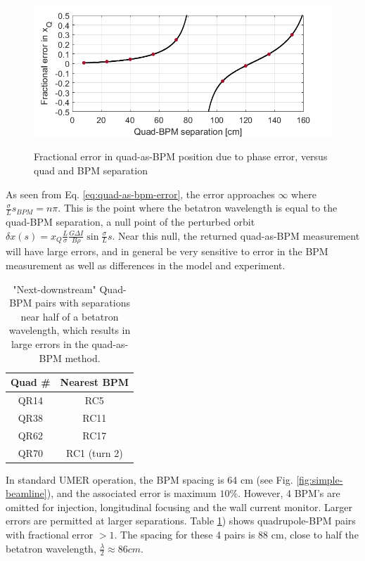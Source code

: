 \begin{figure}
\begin{center}
\includegraphics[width=\textwidth]{4.figures/quad_as_BPM_error.png}
\end{center}
\renewcommand{\baselinestretch}{1}
\small\normalsize
\begin{quote}
\caption[]{Fractional error in quad-as-BPM position due to phase error, versus quad and BPM separation}
\label{fig:quad-as-bpm-error}
\end{quote}
\end{figure} 
\renewcommand{\baselinestretch}{2}
\small\normalsize


As seen from Eq. \ref{eq:quad-as-bpm-error}, the error approaches $\infty$ where $\frac{\sigma}{L}s_{BPM} = n\pi$. This is the point where the betatron wavelength is equal to the quad-BPM separation, a null point of the perturbed orbit $\delta x(s) = x_Q \frac{L}{\sigma} \frac{G \Delta I}{B\rho} \sin{\frac{\sigma}{L}s}$. Near this null, the returned quad-as-BPM measurement will have large errors, and in general be very sensitive to error in the BPM measurement as well as differences in the model and experiment. 


\begin{table}
\centering
\caption{"Next-downstream" Quad-BPM pairs with separations near half of a betatron wavelength, which results in large errors in the quad-as-BPM method.}
\label{tab:nulls}
\begin{tabular}{|c|c|}
Quad \# & Nearest BPM  \\
\hline
QR14 & RC5  \\
QR38 & RC11  \\
QR62 & RC17  \\
QR70 & RC1 (turn 2)  \\
\end{tabular}
\end{table}


In standard UMER operation, the BPM spacing is 64 cm (see Fig. \ref{fig:simple-beamline}), and the associated error is maximum $10\%$. However, 4 BPM's are omitted for injection, longitudinal focusing and the wall current monitor. Larger errors are permitted at larger separations. 
Table \ref{tab:nulls}) shows quadrupole-BPM pairs with fractional error $>1$. The spacing for these 4 pairs is 88 cm, close to half the betatron wavelength, $\frac{\lambda}{2} \approx 86 cm$. 

